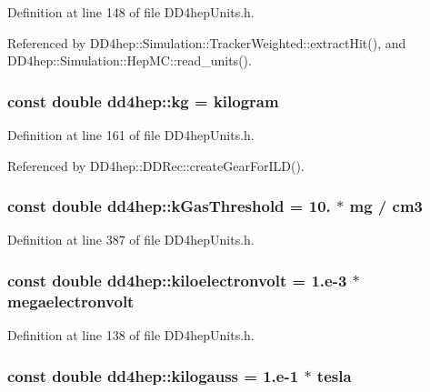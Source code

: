 Definition at line 148 of file DD4hepUnits.h.

Referenced by DD4hep::Simulation::TrackerWeighted::extractHit(), and DD4hep::Simulation::HepMC::read\_\-units().\hypertarget{namespacedd4hep_a14dce8e79bc3ccbc37eaa636bf0f2329}{
\subsubsection[{kg}]{\setlength{\rightskip}{0pt plus 5cm}const double {\bf dd4hep::kg} = {\bf kilogram}}}
\label{namespacedd4hep_a14dce8e79bc3ccbc37eaa636bf0f2329}


Definition at line 161 of file DD4hepUnits.h.

Referenced by DD4hep::DDRec::createGearForILD().\hypertarget{namespacedd4hep_ad7b0ac954bae8a93a0162f9f08fd9766}{
\subsubsection[{kGasThreshold}]{\setlength{\rightskip}{0pt plus 5cm}const double {\bf dd4hep::kGasThreshold} = 10. $\ast$ {\bf mg} / {\bf cm3}}}
\label{namespacedd4hep_ad7b0ac954bae8a93a0162f9f08fd9766}


Definition at line 387 of file DD4hepUnits.h.\hypertarget{namespacedd4hep_a05014d49c7c5438820adf620633249e7}{
\subsubsection[{kiloelectronvolt}]{\setlength{\rightskip}{0pt plus 5cm}const double {\bf dd4hep::kiloelectronvolt} = 1.e-\/3 $\ast$ {\bf megaelectronvolt}}}
\label{namespacedd4hep_a05014d49c7c5438820adf620633249e7}


Definition at line 138 of file DD4hepUnits.h.\hypertarget{namespacedd4hep_a8fe02d4c7d06e1b8969ab673da2787b3}{
\subsubsection[{kilogauss}]{\setlength{\rightskip}{0pt plus 5cm}const double {\bf dd4hep::kilogauss} = 1.e-\/1 $\ast$ {\bf tesla}}}
\label{namespacedd4hep_a8fe02d4c7d06e1b8969ab673da2787b3}


